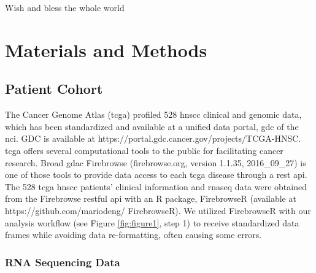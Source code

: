 \documentclass[jpm,article,submit,moreauthors,pdftex]{Definitions/mdpi}
\begin{document}
\begin{paracol}{2}
Wish and bless the whole world

\section{Materials and Methods} %

\subsection{Patient Cohort} 

The Cancer Genome Atlas (\acrshort{tcga}) profiled 528 \acrshort{hnscc} clinical and genomic data, which has been standardized and available at a unified data portal, \acrfull{gdc} of the \acrfull{nci}.
GDC is available at https://portal.gdc.cancer.gov/projects/TCGA-HNSC.
\acrshort{tcga} offers several computational tools to the public for facilitating cancer research.
Broad \acrfull{gdac} Firebrowse (firebrowse.org, version 1.1.35, 2016\_09\_27) is one of those tools to provide data access to each \acrshort{tcga} disease through a \acrfull{rest} \acrfull{api}.
The 528 \acrshort{tcga} \acrshort{hnscc} patients' clinical information and \acrshort{rnaseq} data were obtained from the Firebrowse \acrshort{rest}ful \acrshort{api} with an R package, FirebrowseR (available at https://github.com/mariodeng/\linebreak
FirebrowseR)\cite{Deng2017}. 
We utilized FirebrowseR with our analysis workflow (see Figure \ref{fig:figure1}, step 1) to receive standardized data frames while avoiding data re-formatting, often causing some errors.

\subsubsection{RNA Sequencing Data} 


\end{paracol}
\end{document}
